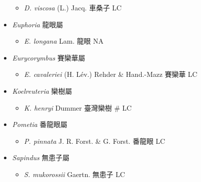 \begin{itemize}
  \begin{itemize}
        \item[] \textit{D. viscosa} (L.) Jacq.  車桑子   LC
  \end{itemize}
 \item[] \textit{Euphoria} 龍眼屬
                                
  \begin{itemize}
        \item[] \textit{E. longana} Lam.  龍眼   NA
  \end{itemize}
 \item[] \textit{Eurycorymbus} 賽欒華屬
                                
  \begin{itemize}
        \item[] \textit{E. cavaleriei} (H. Lév.) Rehder \& Hand.-Mazz  賽欒華   LC
  \end{itemize}
 \item[] \textit{Koelreuteria} 欒樹屬
                                
  \begin{itemize}
        \item[] \textit{K. henryi} Dummer  臺灣欒樹  \# LC
  \end{itemize}
 \item[] \textit{Pometia} 番龍眼屬
                                
  \begin{itemize}
        \item[] \textit{P. pinnata} J. R. Forst. \& G. Forst.  番龍眼   LC
  \end{itemize}
 \item[] \textit{Sapindus} 無患子屬
                                
  \begin{itemize}
        \item[] \textit{S. mukorossii} Gaertn.  無患子   LC
  \end{itemize}
  \end{itemize}
